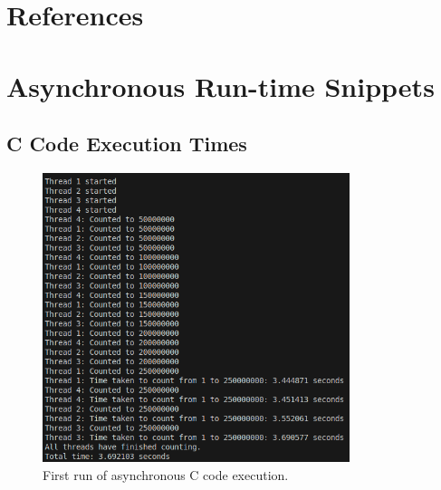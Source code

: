 \documentclass[12pt,a4paper]{article}
\begin{document}
\newpage
\section{References}
\printbibliography

\clearpage
\appendix

\section{Asynchronous Run-time Snippets}

\subsection{C Code Execution Times} 

\begin{figure}[htbp]
    \centering
    \includegraphics[width=0.8\textwidth]{../async_records/results_c/result_1.png}
    \caption{First run of asynchronous C code execution.}
    \label{fig:C-async-runtime-1}
\end{figure}
\end{document}
